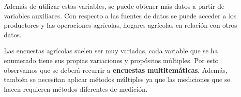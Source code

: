 \bigbreak

Además de utilizar estas variables, se puede obtener más datos a partir de variables auxiliares. Con respecto a las fuentes de datos se puede acceder a los productores y las operaciones agrícolas, hogares agrícolas en relación con otros datos.

\bigbreak

Las encuestas agrícolas suelen ser muy variadas, cada variable que se ha enumerado tiene sus propias variaciones y propósitos múltiples. Por esto observamos que se deberá recurrir a \textbf{encuestas multitemáticas}. Además, también se necesitan aplicar métodos múltiples ya que las mediciones que se hacen requieren métodos diferentes de medición.
